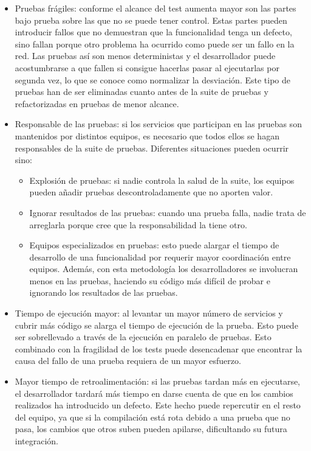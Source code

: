 \documentclass[11pt,a4paper]{article}
\begin{document}
\begin{itemize}

\item Pruebas frágiles: conforme el alcance del test aumenta mayor son las partes bajo prueba sobre las que no se puede tener control. Estas partes pueden introducir fallos que no demuestran que la funcionalidad tenga un defecto, sino fallan porque otro problema ha ocurrido como puede ser un fallo en la red. Las pruebas así son menos deterministas y el desarrollador puede acostumbrarse a que fallen si consigue hacerlas pasar al ejecutarlas por segunda vez, lo que se conoce como normalizar la desviación. Este tipo de pruebas han de ser eliminadas cuanto antes de la suite de pruebas y refactorizadas en pruebas de menor alcance.

\item Responsable de las pruebas: si los servicios que participan en las pruebas son mantenidos por distintos equipos, es necesario que todos ellos se hagan responsables de la suite de pruebas. Diferentes situaciones pueden ocurrir sino:

\begin{itemize}

\item Explosión de pruebas: si nadie controla la salud de la suite, los equipos pueden añadir pruebas descontroladamente que no aporten valor.

\item Ignorar resultados de las pruebas: cuando una prueba falla, nadie trata de arreglarla porque cree que la responsabilidad la tiene otro.

\item Equipos especializados en pruebas: esto puede alargar el tiempo de desarrollo de una funcionalidad por requerir mayor coordinación entre equipos. Además, con esta metodología los desarrolladores se involucran menos en las pruebas, haciendo su código más difícil de probar e ignorando los resultados de las pruebas.

\end{itemize}

\item Tiempo de ejecución mayor: al levantar un mayor número de servicios y cubrir más código se alarga el tiempo de ejecución de la prueba. Esto puede ser sobrellevado a través de la ejecución en paralelo de pruebas. Esto combinado con la fragilidad de los tests puede desencadenar que encontrar la causa del fallo de una prueba requiera de un mayor esfuerzo.

\item Mayor tiempo de retroalimentación: si las pruebas tardan más en ejecutarse, el desarrollador tardará más tiempo en darse cuenta de que en los cambios realizados ha introducido un defecto. Este hecho puede repercutir en el resto del equipo, ya que si la compilación está rota debido a una prueba que no pasa, los cambios que otros suben pueden apilarse, dificultando su futura integración.

\end{itemize}
\end{document}
